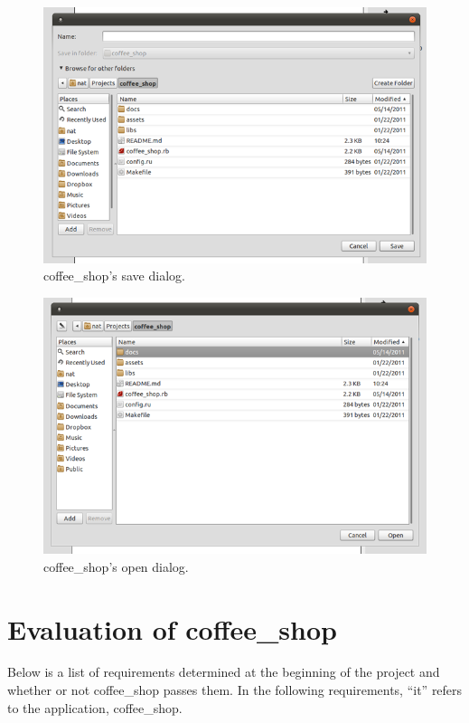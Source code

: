 \documentclass[10pt]{article}
\begin{document}
\begin{figure}
   \centering
      \includegraphics[width=130mm]{images/coffee_shop6.png}
   \caption{coffee\_shop's save dialog.}
\end{figure}

\begin{figure}
   \centering
      \includegraphics[width=130mm]{images/coffee_shop7.png}
   \caption{coffee\_shop's open dialog.}
\end{figure}

\section{Evaluation of coffee\_shop}

Below is a list of requirements determined at the beginning of the project and whether or not coffee\_shop passes them. In the following requirements, ``it'' refers to the application, coffee\_shop.
\end{document}
